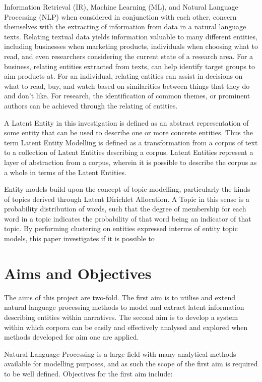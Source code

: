 \documentclass[10pt]{report}
\begin{document}
Information Retrieval (IR), Machine Learning (ML), and Natural Language Processing (NLP) when considered in conjunction with each other,  concern themselves with the extracting of information from data in a natural language texts. Relating textual data yields information valuable to many different entities, including businesses when marketing products, individuals when choosing what to read, and even researchers considering the current state of a research area. For a business, relating entities extracted from texts, can help identify target groups to aim products at. For an individual, relating entities can assist in decisions on what to read, buy, and watch based on similarities between things that they do and don’t like. For research, the identification of common themes, or prominent authors can be achieved through the relating of entities.

A Latent Entity in this investigation is defined as an abstract representation of some entity that can be used to describe one or more concrete entities. Thus the term Latent Entity Modelling is defined as a transformation from a corpus of text to a collection of Latent Entities describing a corpus. Latent Entities represent a layer of abstraction from a corpus,  wherein it is possible to describe the corpus as a whole in terms of the Latent Entities.

Entity models build upon the concept of topic modelling, particularly the kinds of topics derived through Latent Dirichlet Allocation. A Topic in this sense is a probability distribution of words, such that the degree of membership for each word in a topic indicates the probability of that word being an indicator of that topic. By performing clustering on entities expressed interms of entity topic models, this paper investigates if it is possible to 


\section{Aims and Objectives}
The aims of this project are two-fold. The first aim is to utilise and extend natural language processing methods to model and extract latent information describing entities within narratives. The second aim is to develop a system within which corpora can be easily and effectively analysed and explored when methods developed for aim one are applied.

Natural Language Processing is a large field with many analytical methods available for modelling purposes, and as such the scope of the first aim is required to be well defined. Objectives for the first aim include:
\end{document}

